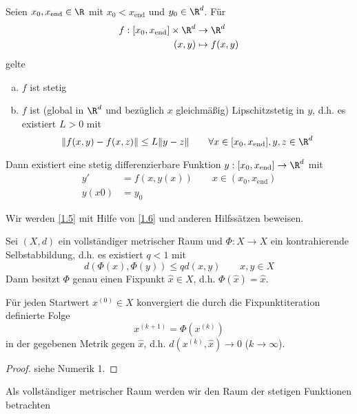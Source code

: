 \documentclass[
]{mycourse}
\begin{document}
\begin{st} \label{1.5}
	Seien $x_0, x_{\text{end}} \in \R$ mit $x_0 < x_{\text{end}}$ und $y_0 \in \R^d$.
	Für
	\begin{align*}
		f: [x_0, x_{\text{end}}] \times \R^d &\to \R^d \\
		(x,y) & \mapsto f(x,y)
	\end{align*}
	gelte
	\begin{enumerate}[a)]
		\item
			$f$ ist stetig
		\item
			$f$ ist (global in $\R^d$ und bezüglich $x$ gleichmäßig) Lipschitzstetig in $y$, d.h. es existiert $L > 0$ mit
			\[
				\|f(x,y) - f(x,z)\| \le L \|y-z\|
				\qquad \forall x\in [x_0,x_{\text{end}}], y,z \in \R^d
			\]
	\end{enumerate}
	Dann existiert eine stetig differenzierbare Funktion $y : [x_0,x_{\text{end}}] \to \R^d$ mit
	\begin{align*}
		y' &= f(x,y(x)) \qquad x\in(x_0,x_{\text{end}}) \\
		y(x0) &= y_0
	\end{align*}
\end{st}

Wir werden \ref{1.5} mit Hilfe von \ref{1.6} und anderen Hilfssätzen beweisen.

\begin{st} \label{1.6}
	Sei $(X,d)$ ein vollständiger metrischer Raum und $\Phi: X \to X$ ein kontrahierende Selbstabbildung, d.h. es existiert $q < 1$ mit
	\[
		d(\Phi(x), \Phi(y)) \le q d(x,y)
		\qquad x,y \in X
	\]
	Dann besitzt $\Phi$ genau einen Fixpunkt $\hat x \in X$, d.h. $\Phi(\hat x) = \hat x$.

	Für jeden Startwert $x^{(0)} \in X$ konvergiert die durch die Fixpunktiteration definierte Folge
	\[
		x^{(k+1)} = \Phi(x^{(k)})
	\]
	in der gegebenen Metrik gegen $\hat x$, d.h. $d(x^{(k)},\hat x) \to 0$ ($k \to \infty$).
	\begin{proof}
		siehe Numerik 1.
	\end{proof}
\end{st}


Als vollständiger metrischer Raum werden wir den Raum der stetigen Funktionen betrachten
\end{document}
